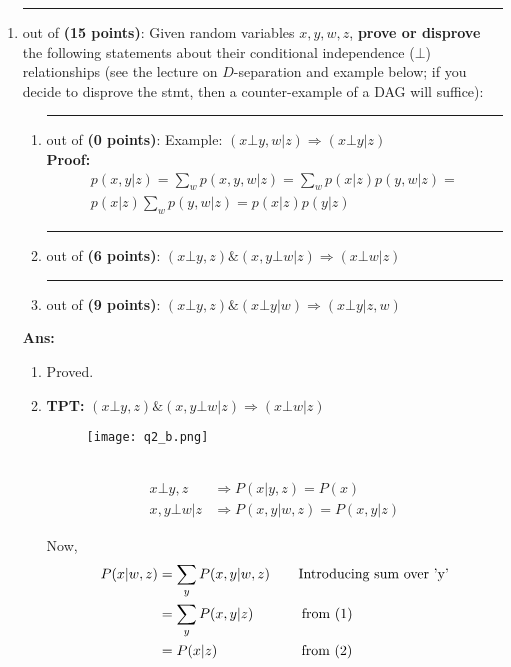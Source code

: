 \documentclass{article}%
\begin{document}
\begin{enumerate}
\item \rule{0.5 in}{1 pt} out of \textbf{(15 points)}: Given random variables $x, y, w, z$, \textbf{prove or disprove} the following statements about their conditional independence ($\bot$) relationships (see the lecture on $D$-separation and example below; if you decide to disprove the stmt, then a counter-example of a DAG will suffice):
	\begin{enumerate}
	\item \rule{0.5 in}{1 pt} out of \textbf{(0 points)}: Example: $(x \bot y, w | z) \Longrightarrow (x \bot y | z)$\\
	\textbf{Proof:} 
\[\begin{array}{l}
p(x,y | z) = \sum\limits_w {p(x,y,w|z) = } \sum\limits_w {p(x|z)p(y,w|z) = } \\
p(x|z)\sum\limits_w {p(y,w|z) = } p(x|z)p(y|z)
\end{array}\]

	\item \rule{0.5 in}{1 pt} out of \textbf{(6 points)}: $(x \bot y, z) \& (x, y \bot w | z) \Longrightarrow (x \bot w | z)$\\
	
	\item \rule{0.5 in}{1 pt} out of \textbf{(9 points)}: $(x \bot y, z) \& (x \bot y | w) \Longrightarrow (x \bot y | z, w)$\\
	
	\end{enumerate}

\textbf{Ans:} \\
\begin{enumerate}
\item Proved.
\item \textbf{TPT:} $(x \bot y, z) \& (x, y \bot w | z) \Longrightarrow (x \bot w | z)$
\begin{figure}[h]
\centering
\texttt{[image: q2\_b.png]}
\end{figure} \\
\begin{align}
x \bot y, z & \Longrightarrow P(x | y,z) = P(x) \\
x, y \bot w | z & \Longrightarrow P(x, y | w, z) = P(x, y | z)
\end{align}

Now,
\begin{align*}
P(x | w, z) & = \sum_{y} P(x, y | w, z) \text{\hspace{0.6cm} Introducing sum over 'y'}\\
& = \sum_{y} P(x, y | z) \text{\hspace{1.1cm} from (1) }\\
& = P(x | z) \text{\hspace{2cm} from (2) }
\end{align*}


\end{enumerate}
\end{enumerate}
\end{document}
